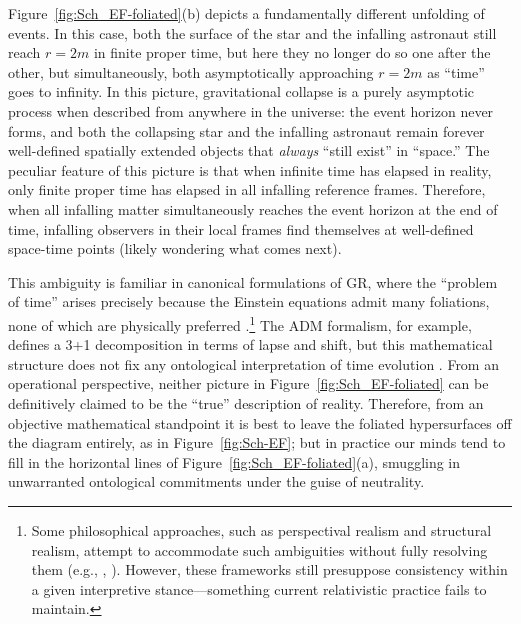 \documentclass[12pt]{book}
\begin{document}
Figure~\ref{fig:Sch_EF-foliated}(b) depicts a fundamentally different unfolding of events. In this case, both the surface of the star and the infalling astronaut still reach $r=2m$ in finite proper time, but here they no longer do so one after the other, but simultaneously, both asymptotically approaching $r=2m$ as ``time'' goes to infinity. In this picture, gravitational collapse is a purely asymptotic process when described from anywhere in the universe: the event horizon never forms, and both the collapsing star and the infalling astronaut remain forever well-defined spatially extended objects that \textit{always} ``still exist'' in ``space.'' The peculiar feature of this picture is that when infinite time has elapsed in reality, only finite proper time has elapsed in all infalling reference frames. Therefore, when all infalling matter simultaneously reaches the event horizon at the end of time, infalling observers in their local frames find themselves at well-defined space-time points (likely wondering what comes next). 

This ambiguity is familiar in canonical formulations of GR, where the ``problem of time'' arises precisely because the Einstein equations admit many foliations, none of which are physically preferred \citep{isham1993}.\footnote{Some philosophical approaches, such as perspectival realism and structural realism, attempt to accommodate such ambiguities without fully resolving them (e.g., \citealt{Ladyman2007}, \citealt{Massimi2012}). However, these frameworks still presuppose consistency within a given interpretive stance---something current relativistic practice fails to maintain.} The ADM formalism, for example, defines a 3+1 decomposition in terms of lapse and shift, but this mathematical structure does not fix any ontological interpretation of time evolution \citep{arnowitt1962,arnowitt2008}. From an operational perspective, neither picture in Figure~\ref{fig:Sch_EF-foliated} can be definitively claimed to be the ``true'' description of reality. Therefore, from an objective mathematical standpoint it is best to leave the foliated hypersurfaces off the diagram entirely, as in Figure~\ref{fig:Sch-EF}; but in practice our minds tend to fill in the horizontal lines of Figure~\ref{fig:Sch_EF-foliated}(a), smuggling in unwarranted ontological commitments under the guise of neutrality.
\end{document}

